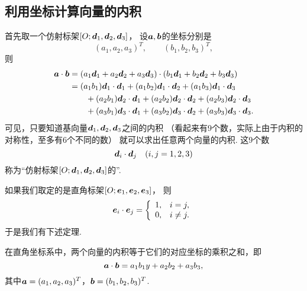 \subsection{利用坐标计算向量的内积}
首先取一个仿射标架\([O;\boldsymbol{d}_1,\boldsymbol{d}_2,\boldsymbol{d}_3]\)，
设\(\boldsymbol{a},\boldsymbol{b}\)的坐标分别是\begin{equation*}
	(a_1,a_2,a_3)^T, \qquad
	(b_1,b_2,b_3)^T,
\end{equation*}
则\begin{align*}
	\boldsymbol{a}\cdot\boldsymbol{b}
	&= (a_1 \boldsymbol{d}_1 + a_2 \boldsymbol{d}_2 + a_3 \boldsymbol{d}_3)\cdot(b_1 \boldsymbol{d}_1 + b_2 \boldsymbol{d}_2 + b_3 \boldsymbol{d}_3) \\
	&= (a_1 b_1) \boldsymbol{d}_1\cdot\boldsymbol{d}_1
		+ (a_1 b_2) \boldsymbol{d}_1\cdot\boldsymbol{d}_2
		+ (a_1 b_3) \boldsymbol{d}_1\cdot\boldsymbol{d}_3 \\
	&\hspace{20pt}
		+ (a_2 b_1) \boldsymbol{d}_2\cdot\boldsymbol{d}_1
		+ (a_2 b_2) \boldsymbol{d}_2\cdot\boldsymbol{d}_2
		+ (a_2 b_3) \boldsymbol{d}_2\cdot\boldsymbol{d}_3 \\
	&\hspace{20pt}
		+ (a_3 b_1) \boldsymbol{d}_3\cdot\boldsymbol{d}_1
		+ (a_3 b_2) \boldsymbol{d}_3\cdot\boldsymbol{d}_2
		+ (a_3 b_3) \boldsymbol{d}_3\cdot\boldsymbol{d}_3.
\end{align*}
可见，只要知道基向量\(\boldsymbol{d}_1,\boldsymbol{d}_2,\boldsymbol{d}_3\)之间的内积
（看起来有9个数，实际上由于内积的对称性，至多有6个不同的数）
就可以求出任意两个向量的内积.
这9个数\begin{equation*}
	\boldsymbol{d}_i\cdot\boldsymbol{d}_j
	\quad(i,j=1,2,3)
\end{equation*}
称为“仿射标架\([O;\boldsymbol{d}_1,\boldsymbol{d}_2,\boldsymbol{d}_3]\)的”.

如果我们取定的是直角标架\([O;\boldsymbol{e}_1,\boldsymbol{e}_2,\boldsymbol{e}_3]\)，
则\begin{equation*}
	\boldsymbol{e}_i\cdot\boldsymbol{e}_j
	= \left\{ \begin{array}{ll}
		1, & i = j, \\
		0, & i \neq j.
	\end{array} \right.
\end{equation*}
于是我们有下述定理.
\begin{theorem}\label{theorem:解析几何.直角坐标系下向量内积的坐标计算式}
在直角坐标系中，两个向量的内积等于它们的对应坐标的乘积之和，即
\begin{equation}
	\boldsymbol{a}\cdot\boldsymbol{b}
	= a_1 b_1 y + a_2 b_2 + a_3 b_3,
\end{equation}
其中\(\boldsymbol{a}=(a_1,a_2,a_3)^T\)，\(\boldsymbol{b}=(b_1,b_2,b_3)^T\).
\end{theorem}


